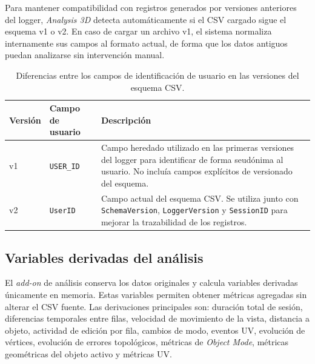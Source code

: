 Para mantener compatibilidad con registros generados por versiones anteriores del logger, \textit{Analysis 3D} detecta automáticamente si el CSV cargado sigue el esquema v1 o v2. En caso de cargar un archivo v1, el sistema normaliza internamente sus campos al formato actual, de forma que los datos antiguos puedan analizarse sin intervención manual.

\begin{table}[H]
\centering
\small
\renewcommand{\arraystretch}{1.15}
\begin{tabularx}{\textwidth}{p{2.5cm}p{3.5cm}X}
\toprule
\textbf{Versión} & \textbf{Campo de usuario} & \textbf{Descripción} \\
\midrule
v1 & \texttt{USER\_ID} & Campo heredado utilizado en las primeras versiones del logger para identificar de forma seudónima al usuario. No incluía campos explícitos de versionado del esquema. \\
v2 & \texttt{UserID} & Campo actual del esquema CSV. Se utiliza junto con \texttt{SchemaVersion}, \texttt{LoggerVersion} y \texttt{SessionID} para mejorar la trazabilidad de los registros. \\
\bottomrule
\end{tabularx}
\caption{Diferencias entre los campos de identificación de usuario en las versiones del esquema CSV.}
\label{tab:csv-userid-v1-v2}
\end{table}

\subsection{Variables derivadas del análisis}
\label{subsec:c-variables-derivadas}

El \textit{add-on} de análisis conserva los datos originales y calcula variables derivadas únicamente en memoria. Estas variables permiten obtener métricas agregadas sin alterar el CSV fuente. Las derivaciones principales son: duración total de sesión, diferencias temporales entre filas, velocidad de movimiento de la vista, distancia a objeto, actividad de edición por fila, cambios de modo, eventos UV, evolución de vértices, evolución de errores topológicos, métricas de \textit{Object Mode}, métricas geométricas del objeto activo y métricas UV.

